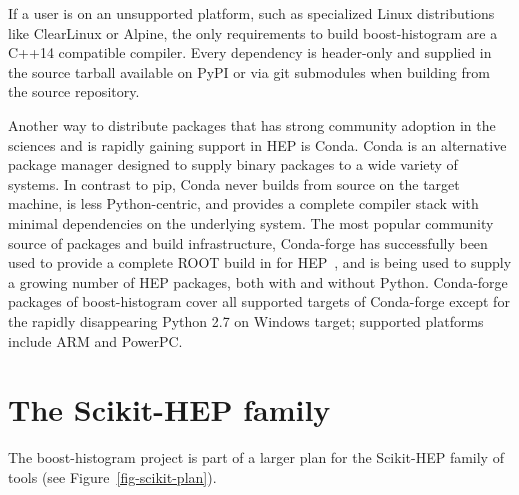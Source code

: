 \documentclass{webofc}
\begin{document}
If a user is on an unsupported platform, such as specialized Linux distributions like ClearLinux or Alpine, the only requirements to build boost-histogram are a C++14 compatible compiler. Every dependency is header-only and supplied in the source tarball available on PyPI or via git submodules when building from the source repository.

Another way to distribute packages that has strong community adoption in the sciences and is rapidly gaining support in HEP is Conda. Conda is an alternative package manager designed to supply binary packages to a wide variety of systems. In contrast to pip, Conda never builds from source on the target machine, is less Python-centric, and provides a complete compiler stack with minimal dependencies on the underlying system. The most popular community source of packages and build infrastructure, Conda-forge has successfully been used to provide a complete ROOT build in for HEP~\cite{Burr:2019chep}, and is being used to supply a growing number of HEP packages, both with and without Python. Conda-forge packages of boost-histogram cover all supported targets of Conda-forge except for the rapidly disappearing Python 2.7 on Windows target; supported platforms include ARM and PowerPC.

\section{The Scikit-HEP family}
\label{sec-3}

The boost-histogram project is part of a larger plan for the Scikit-HEP family of tools (see Figure~\ref{fig-scikit-plan}).
\end{document}
